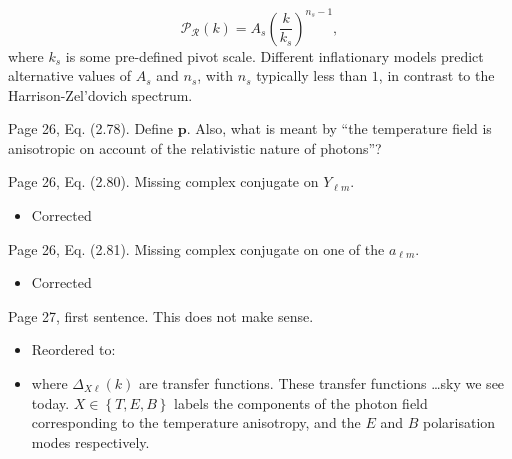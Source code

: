 \documentclass[11pt]{article}
\newcommand{\todo}[1]{{\color{red} #1}}
\begin{document}
\begin{enumerate}
\begin{itemize}
\begin{equation}
    \mathcal{P}_\mathcal{R}(k) = A_s {\left( \frac{k}{k_s} \right)}^{n_s-1},
  \label{eqn:cos:lcdm_power}
  \tag{2.77}
\end{equation}
where \(k_s\) is some pre-defined pivot scale.
Different inflationary models predict alternative values of \(A_s\) and \(n_s\), with \(n_s\) typically less than \(1\), in contrast to the Harrison-Zel'dovich spectrum.
  \end{itemize}
\todo{
\item Page 26, Eq. (2.78). Define $\mathbf{p}$. Also, what is meant by
  ``the temperature field is anisotropic on account of the
  relativistic nature of photons''?
}
\item Page 26, Eq. (2.80). Missing complex conjugate on $Y_{\ell m}$.
  \begin{itemize}
    \item Corrected
  \end{itemize}
\item Page 26, Eq. (2.81). Missing complex conjugate on one of the
  $a_{\ell m}$.
  \begin{itemize}
    \item Corrected
  \end{itemize}
\item Page 27, first sentence. This does not make sense.
  \begin{itemize}
    \item Reordered to:
    \item where \(\Delta_{X\ell}(k)\) are transfer functions. These transfer functions \ldots  sky we see today. 
 \({X\in\left\{ T,E,B \right\}}\) labels the components of the photon field corresponding to the temperature anisotropy, and the \(E\) and \(B\) polarisation modes respectively.
  \end{itemize}
\end{enumerate}
\end{document}
